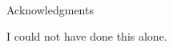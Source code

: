 
\renewcommand{\baselinestretch}{2}
\small\normalsize
\hbox{\ }

\vspace{-.65in}

\begin{center}
\large{Acknowledgments}
\end{center}

\vspace{1ex}

I could not have done this alone. 
